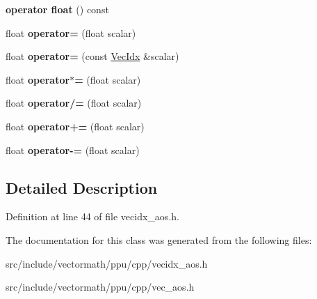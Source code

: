 \begin{DoxyCompactItemize}
\item 
\hypertarget{classVectormath_1_1Aos_1_1VecIdx_aecba0ac0fdaea640cb3c373eb21cfdda}{{\bfseries operator float} () const }\label{classVectormath_1_1Aos_1_1VecIdx_aecba0ac0fdaea640cb3c373eb21cfdda}

\item 
\hypertarget{classVectormath_1_1Aos_1_1VecIdx_a2900ce64010206c5eb676f6c9338adbd}{float {\bfseries operator=} (float scalar)}\label{classVectormath_1_1Aos_1_1VecIdx_a2900ce64010206c5eb676f6c9338adbd}

\item 
\hypertarget{classVectormath_1_1Aos_1_1VecIdx_afcd2bedac1ae7f5b7549accb77f3edbc}{float {\bfseries operator=} (const \hyperlink{classVectormath_1_1Aos_1_1VecIdx}{Vec\-Idx} \&scalar)}\label{classVectormath_1_1Aos_1_1VecIdx_afcd2bedac1ae7f5b7549accb77f3edbc}

\item 
\hypertarget{classVectormath_1_1Aos_1_1VecIdx_aac958ef606b0f2c185f3713bf5649ddc}{float {\bfseries operator$\ast$=} (float scalar)}\label{classVectormath_1_1Aos_1_1VecIdx_aac958ef606b0f2c185f3713bf5649ddc}

\item 
\hypertarget{classVectormath_1_1Aos_1_1VecIdx_a6f435d5924a565ec2a04949778d47ca6}{float {\bfseries operator/=} (float scalar)}\label{classVectormath_1_1Aos_1_1VecIdx_a6f435d5924a565ec2a04949778d47ca6}

\item 
\hypertarget{classVectormath_1_1Aos_1_1VecIdx_a9c2012ddcb1884faba437e6f8950ed7d}{float {\bfseries operator+=} (float scalar)}\label{classVectormath_1_1Aos_1_1VecIdx_a9c2012ddcb1884faba437e6f8950ed7d}

\item 
\hypertarget{classVectormath_1_1Aos_1_1VecIdx_a97233d2ad8b81b3741f8d59ac61d427d}{float {\bfseries operator-\/=} (float scalar)}\label{classVectormath_1_1Aos_1_1VecIdx_a97233d2ad8b81b3741f8d59ac61d427d}

\end{DoxyCompactItemize}


\subsection{Detailed Description}


Definition at line 44 of file vecidx\-\_\-aos.\-h.



The documentation for this class was generated from the following files\-:\begin{DoxyCompactItemize}
\item 
src/include/vectormath/ppu/cpp/vecidx\-\_\-aos.\-h\item 
src/include/vectormath/ppu/cpp/vec\-\_\-aos.\-h\end{DoxyCompactItemize}
